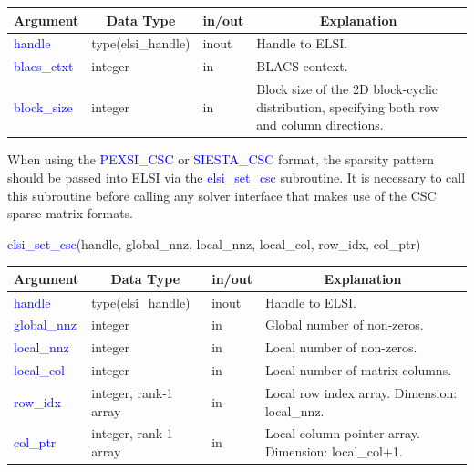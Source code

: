 \documentclass{report}
\begin{document}
\begin{tabular}[]{|p{30mm}|p{30mm}|p{15mm}|p{90mm}|}
\hline
\multicolumn{1}{|c|}{\textbf{Argument}} & \multicolumn{1}{c|}{\textbf{Data Type}} & \multicolumn{1}{c|}{\textbf{in/out}} & \multicolumn{1}{c|}{\textbf{Explanation}}\\
\hline
\textcolor{blue}{handle}      & type(elsi\_handle) & inout & Handle to ELSI.\\
\hline
\textcolor{blue}{blacs\_ctxt} & integer            & in    & BLACS context.\\
\hline
\textcolor{blue}{block\_size} & integer            & in    & Block size of the 2D block-cyclic distribution, specifying both row and column directions.\\
\hline
\end{tabular}

When using the \textcolor{blue}{PEXSI\_CSC} or \textcolor{blue}{SIESTA\_CSC} format, the sparsity pattern should be passed into ELSI via the \textcolor{blue}{elsi\_set\_csc} subroutine. It is necessary to call this subroutine before calling any solver interface that makes use of the CSC sparse matrix formats.
\begin{labeling}{\hspace{6cm}}
\item [\hspace{0.3cm} \textcolor{blue}{elsi\_set\_csc}(handle, global\_nnz, local\_nnz, local\_col, row\_idx, col\_ptr)]
\end{labeling}

\begin{tabular}[]{|p{30mm}|p{35mm}|p{15mm}|p{85mm}|}
\hline
\multicolumn{1}{|c|}{\textbf{Argument}} & \multicolumn{1}{c|}{\textbf{Data Type}} & \multicolumn{1}{c|}{\textbf{in/out}} & \multicolumn{1}{c|}{\textbf{Explanation}}\\
\hline
\textcolor{blue}{handle}      & type(elsi\_handle)    & inout & Handle to ELSI.\\
\hline
\textcolor{blue}{global\_nnz} & integer               & in    & Global number of non-zeros.\\
\hline
\textcolor{blue}{local\_nnz}  & integer               & in    & Local number of non-zeros.\\
\hline
\textcolor{blue}{local\_col}  & integer               & in    & Local number of matrix columns.\\
\hline
\textcolor{blue}{row\_idx}    & integer, rank-1 array & in    & Local row index array. Dimension: local\_nnz.\\
\hline
\textcolor{blue}{col\_ptr}    & integer, rank-1 array & in    & Local column pointer array. Dimension: local\_col+1.\\
\hline
\end{tabular}
\end{document}
